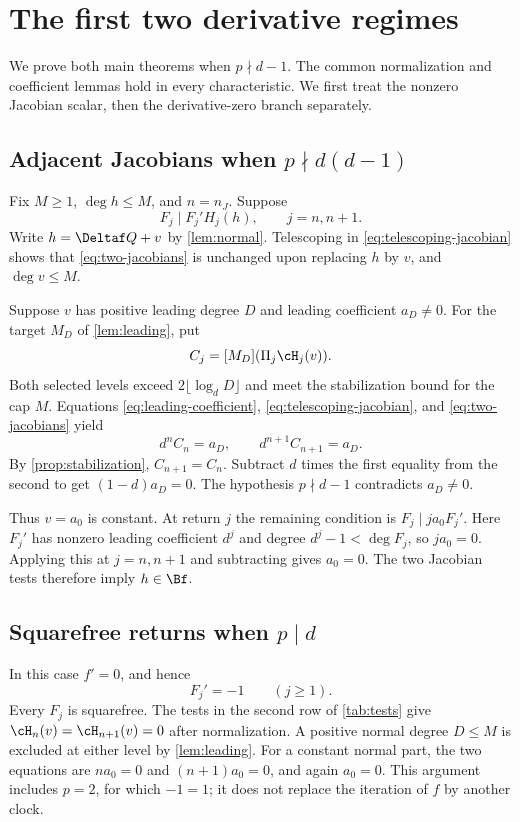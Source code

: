 \section{The first two derivative regimes}
\label{sec:jacobian}

We prove both main theorems when $p\nmid d-1$. The common
normalization and coefficient lemmas hold in every characteristic.
We first treat the nonzero Jacobian scalar, then the
derivative-zero branch separately.

\subsection{Adjacent Jacobians when $p\nmid d(d-1)$}

Fix $M\ge1$, $\deg h\le M$, and $n=n_J$. Suppose
\begin{equation}
 F_j\mid F_j'H_j(h),\qquad j=n,n+1.
 \label{eq:two-jacobians}
\end{equation}
Write $h=\Deltaf Q+v$ by \cref{lem:normal}. Telescoping in
\eqref{eq:telescoping-jacobian} shows that
\eqref{eq:two-jacobians} is unchanged upon replacing $h$ by $v$,
and $\deg v\le M$.

Suppose $v$ has positive leading degree $D$ and leading
coefficient $a_D\ne0$. For the target $M_D$ of
\cref{lem:leading}, put
\[
 C_j=[M_D](\Pi_j\cH_j(v)).
\]
Both selected levels exceed $2\lfloor\log_dD\rfloor$ and meet
the stabilization bound for the cap $M$. Equations
\eqref{eq:leading-coefficient}, \eqref{eq:telescoping-jacobian},
and \eqref{eq:two-jacobians} yield
\begin{equation}
 d^nC_n=a_D,\qquad d^{n+1}C_{n+1}=a_D.
 \label{eq:two-leading-jacobians}
\end{equation}
By \cref{prop:stabilization}, $C_{n+1}=C_n$. Subtract $d$
times the first equality from the second to get
$(1-d)a_D=0$. The hypothesis $p\nmid d-1$ contradicts
$a_D\ne0$.

Thus $v=a_0$ is constant. At return $j$ the remaining condition
is $F_j\mid ja_0F_j'$. Here $F_j'$ has nonzero leading
coefficient $d^j$ and degree $d^j-1<\deg F_j$, so
$ja_0=0$. Applying this at $j=n,n+1$ and subtracting gives
$a_0=0$. The two Jacobian tests therefore imply $h\in\Bf$.

\subsection{Squarefree returns when $p\mid d$}

In this case $f'=0$, and hence
\begin{equation}
 F_j'=-1\qquad(j\ge1).
 \label{eq:derivative-zero}
\end{equation}
Every $F_j$ is squarefree. The tests in the second row of
\cref{tab:tests} give $\cH_n(v)=\cH_{n+1}(v)=0$ after
normalization. A positive normal degree $D\le M$ is excluded
at either level by \cref{lem:leading}. For a constant normal
part, the two equations are $na_0=0$ and $(n+1)a_0=0$,
and again $a_0=0$. This argument includes $p=2$, for which
$-1=1$; it does not replace the iteration of $f$ by another clock.


